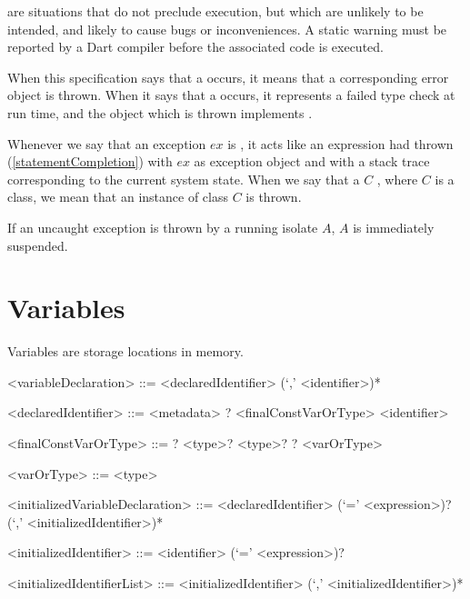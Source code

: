 \documentclass[makeidx]{article}
\begin{document}

\LMHash{}%
are situations that do not preclude execution,
but which are unlikely to be intended,
and likely to cause bugs or inconveniences.
A static warning must be reported by a Dart compiler before the associated code is executed.

\LMHash{}%
When this specification says that a  occurs,
it means that a corresponding error object is thrown.
When it says that a  occurs,
it represents a failed type check at run time,
and the object which is thrown implements .

\LMHash{}%
Whenever we say that an exception $ex$ is
,
it acts like an expression had thrown (\ref{statementCompletion})
with $ex$ as exception object and with a stack trace
corresponding to the current system state.
When we say that a $C$ ,
where $C$ is a class, we mean that an instance of class $C$ is thrown.

\LMHash{}%
If an uncaught exception is thrown by a running isolate $A$, $A$ is immediately suspended.


\section{Variables}

\LMHash{}%
Variables are storage locations in memory.

\begin{grammar}
<variableDeclaration> ::= <declaredIdentifier> (`,' <identifier>)*

<declaredIdentifier> ::= <metadata> \COVARIANT{}? <finalConstVarOrType> <identifier>

<finalConstVarOrType> ::= \LATE{}? \FINAL{} <type>?
  \alt \CONST{} <type>?
  \alt \LATE{}? <varOrType>

<varOrType> ::= \VAR{}
  \alt <type>

<initializedVariableDeclaration> ::= \gnewline{}
  <declaredIdentifier> (`=' <expression>)? (`,' <initializedIdentifier>)*

<initializedIdentifier> ::= <identifier> (`=' <expression>)?

<initializedIdentifierList> ::= <initializedIdentifier> (`,' <initializedIdentifier>)*
\end{grammar}
\end{document}
